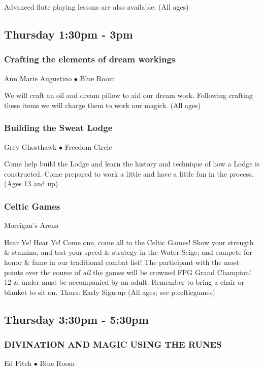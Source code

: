 Advanced flute playing lessons are also available. {\small (All ages)}

\subsection{Thursday 1:30pm - 3pm}

\subsubsection{Crafting the elements of dream workings}
\label{Thu-AMA2}
{\small Ann Marie Augustino $\bullet$  Blue Room}

 We will craft an oil and dream pillow to aid our dream work.  Following crafting these items we will charge them to work our magick. {\small (All ages)}

\subsubsection{Building the Sweat Lodge}
\label{Thu-Ghosthawk1}
{\small Grey Ghosthawk $\bullet$  Freedom Circle}

 Come help build the Lodge and learn the history and technique of how a Lodge is constructed.  Come prepared to work a little and have a little fun in the process. {\small (Ages 13 and up)}

\subsubsection{Celtic Games}
\label{Thu-Celts1}
{\small  Morrigan's Arena}

 Hear Ye! Hear Ye! Come one, come all to the Celtic Games! Show your strength \& stamina, and test your speed \& strategy in the Water Seige; and compete for honor \& fame in our traditional combat list!  The participant with the most points over the course of \textit{all} the games will be crowned FPG Grand Champion! 12 \& under must be accompanied by an adult.  Remember to bring a chair or blanket to sit on. Thurs: Early Sign-up {\small (All ages; see p.{celticgames})}

\subsection{Thursday 3:30pm - 5:30pm}

\subsubsection{DIVINATION AND MAGIC USING THE RUNES}
\label{Thu-Fitch4}
{\small Ed Fitch $\bullet$  Blue Room}


